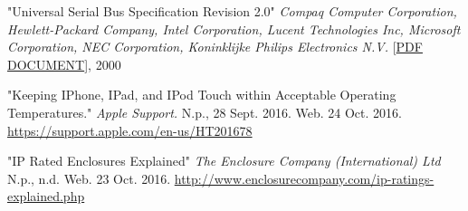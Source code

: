 



\begin{thebibliography}{}

"Universal Serial Bus Specification Revision 2.0"
\emph{Compaq Computer Corporation,
Hewlett-Packard Company, Intel Corporation, Lucent Technologies Inc,
Microsoft Corporation, NEC Corporation, Koninklijke Philips Electronics N.V.} \small{[\href{http://www.pjrc.com/teensy/beta/usb20.pdf\#page=206}{PDF DOCUMENT}]}, \normalsize 2000
 
"Keeping IPhone, IPad, and IPod Touch within Acceptable Operating Temperatures."
\emph{Apple Support.} N.p., 28 Sept. 2016. Web. 24 Oct. 2016. \url{https://support.apple.com/en-us/HT201678}

"IP Rated Enclosures Explained"
\emph{The Enclosure Company (International) Ltd} N.p., n.d. Web. 23 Oct. 2016. \url{http://www.enclosurecompany.com/ip-ratings-explained.php}



\end{thebibliography}







    

    


    

    
    

    
    



    

    

    

    
    